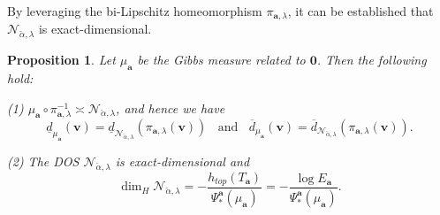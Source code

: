 \documentclass[reqno,11pt,graphicx,]{amsart}
\numberwithin{equation}{section}
\theoremstyle{plain}
\newcommand{\3}{\mathbf{3}}
\newcommand{\ma}{\mathbf{a}}
\newcommand{\mv}{\mathbf{v}}
\newtheorem{proposition}[theorem]{Proposition}
\begin{document}
	By leveraging the bi-Lipschitz homeomorphism $\pi_{\ma,\lambda}$, it can be established that $\mathcal{N}_{\check{\alpha},\lambda}$ is exact-dimensional.
	\begin{proposition}\label{mu-N}
		Let $\mu_{\ma}$ be the Gibbs measure related to $\mathbf{0}$. Then the following hold:
		
		(1) $\mu_{\mathbf{a}
		}\circ\pi_{\ma,\lambda}^{-1}\asymp\mathcal{N}_{\check{\alpha},\lambda}$, and hence we have
		\begin{equation*}
			\underline{d}_{\mu_{\ma}}(\mv)=\underline{d}_{\mathcal{N}_{\check{\alpha},\lambda}}(\pi_{\ma,\lambda}(\mv))\ \ \ \ \text{and} \ \ \ \ \overline{d}_{\mu_{\ma}}(\mv)=\overline{d}_{\mathcal{N}_{\check{\alpha},\lambda}}(\pi_{\ma,\lambda}(\mv)).
		\end{equation*}	
		
		(2) The DOS $\mathcal{N}_{\check{\alpha},\lambda}$ is exact-dimensional and 
		\begin{equation*}\label{loc-dim}
			\dim_H\mathcal{N}_{\check{\alpha},\lambda}=-\frac{h_{top}(T_{\ma})}{\Psi^{\ma}_*(\mu_{\ma})}=-\frac{\log E_{\ma}}{\Psi^{\ma}_*(\mu_{\ma})}. %
		\end{equation*}
	\end{proposition}
\end{document}
